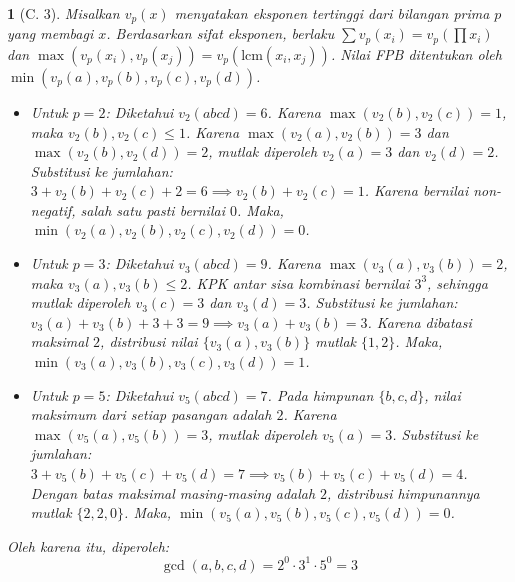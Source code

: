 \documentclass[11pt,a4paper,DIV=12]{scrartcl}
\theoremstyle{problemstyle}
\theoremstyle{answerstyle}
\newtheorem{answer}{}
\begin{document}
\begin{answer}[C. 3]
  Misalkan $v_p(x)$ menyatakan eksponen tertinggi dari bilangan prima $p$ yang membagi $x$. Berdasarkan sifat eksponen, berlaku $\sum v_p(x_i) = v_p(\prod x_i)$ dan $\max(v_p(x_i), v_p(x_j)) = v_p(\text{lcm}(x_i,x_j))$. Nilai FPB ditentukan oleh $\min(v_p(a), v_p(b), v_p(c), v_p(d))$.

  \begin{itemize}
    \item Untuk $p = 2$:
          Diketahui $v_2(abcd) = 6$. Karena $\max(v_2(b), v_2(c)) = 1$, maka $v_2(b), v_2(c) \le 1$.
          Karena $\max(v_2(a), v_2(b)) = 3$ dan $\max(v_2(b), v_2(d)) = 2$, mutlak diperoleh $v_2(a) = 3$ dan $v_2(d) = 2$.
          Substitusi ke jumlahan: $3 + v_2(b) + v_2(c) + 2 = 6 \implies v_2(b) + v_2(c) = 1$.
          Karena bernilai non-negatif, salah satu pasti bernilai $0$.
          Maka, $\min(v_2(a), v_2(b), v_2(c), v_2(d)) = 0$.

    \item Untuk $p = 3$:
          Diketahui $v_3(abcd) = 9$. Karena $\max(v_3(a), v_3(b)) = 2$, maka $v_3(a), v_3(b) \le 2$.
          KPK antar sisa kombinasi bernilai $3^3$, sehingga mutlak diperoleh $v_3(c) = 3$ dan $v_3(d) = 3$.
          Substitusi ke jumlahan: $v_3(a) + v_3(b) + 3 + 3 = 9 \implies v_3(a) + v_3(b) = 3$.
          Karena dibatasi maksimal $2$, distribusi nilai $\{v_3(a), v_3(b)\}$ mutlak $\{1, 2\}$.
          Maka, $\min(v_3(a), v_3(b), v_3(c), v_3(d)) = 1$.

    \item Untuk $p = 5$:
          Diketahui $v_5(abcd) = 7$. Pada himpunan $\{b, c, d\}$, nilai maksimum dari setiap pasangan adalah $2$.
          Karena $\max(v_5(a), v_5(b)) = 3$, mutlak diperoleh $v_5(a) = 3$.
          Substitusi ke jumlahan: $3 + v_5(b) + v_5(c) + v_5(d) = 7 \implies v_5(b) + v_5(c) + v_5(d) = 4$.
          Dengan batas maksimal masing-masing adalah $2$, distribusi himpunannya mutlak $\{2, 2, 0\}$.
          Maka, $\min(v_5(a), v_5(b), v_5(c), v_5(d)) = 0$.
  \end{itemize}

  Oleh karena itu, diperoleh:
  \[
    \gcd(a,b,c,d) = 2^0 \cdot 3^1 \cdot 5^0 = \boxed{3}
  \]
\end{answer}
\end{document}
